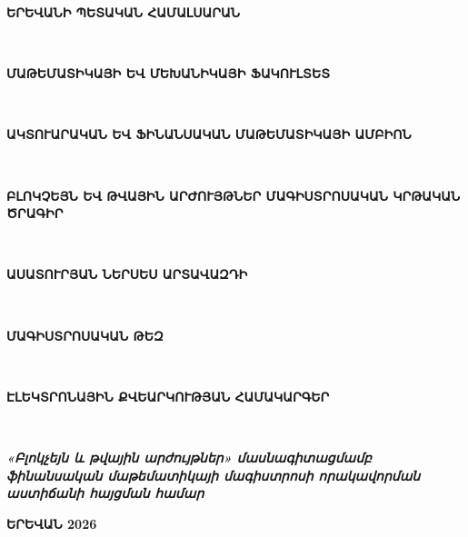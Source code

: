 \documentclass[12pt,a4paper,oneside]{report}
\begin{document}
\begin{titlepage}
\centering
\begin{armenian}
\fontsize{18}{22}\selectfont\textbf{ԵՐԵՎԱՆԻ ՊԵՏԱԿԱՆ ՀԱՄԱԼՍԱՐԱՆ}
\end{armenian}
\\[1.2cm]
\begin{armenian}
\fontsize{18}{22}\selectfont\textbf{ՄԱԹԵՄԱՏԻԿԱՅԻ ԵՎ ՄԵԽԱՆԻԿԱՅԻ ՖԱԿՈՒԼՏԵՏ}
\end{armenian}
\\[0.8cm]
\begin{armenian}
\fontsize{16}{20}\selectfont\textbf{ԱԿՏՈՒԱՐԱԿԱՆ ԵՎ ՖԻՆԱՆՍԱԿԱՆ ՄԱԹԵՄԱՏԻԿԱՅԻ ԱՄԲԻՈՆ}
\end{armenian}
\\[0.8cm]
\begin{armenian}
\fontsize{18}{22}\selectfont\textbf{ԲԼՈԿՉԵՅՆ ԵՎ ԹՎԱՅԻՆ ԱՐԺՈՒՅԹՆԵՐ ՄԱԳԻՍՏՐՈՍԱԿԱՆ ԿՐԹԱԿԱՆ ԾՐԱԳԻՐ}
\end{armenian}
\\[2.5cm]
\begin{armenian}
\fontsize{18}{22}\selectfont\textbf{ԱՍԱՏՈՒՐՅԱՆ ՆԵՐՍԵՍ ԱՐՏԱՎԱԶԴԻ}
\end{armenian}
\\[1.5cm]
\begin{armenian}
\fontsize{18}{22}\selectfont\textbf{ՄԱԳԻՍՏՐՈՍԱԿԱՆ ԹԵԶ}
\end{armenian}
\\[0.8cm]
\begin{armenian}
\fontsize{16}{20}\selectfont\textbf{ԷԼԵԿՏՐՈՆԱՅԻՆ ՔՎԵԱՐԿՈՒԹՅԱՆ ՀԱՄԱԿԱՐԳԵՐ}
\end{armenian}
\\[1.5cm]
\begin{armenian}
\fontsize{14}{18}\selectfont\textit{\textbf{«Բլոկչեյն և թվային արժույթներ» մասնագիտացմամբ\\
ֆինանսական մաթեմատիկայի մագիստրոսի որակավորման\\
աստիճանի հայցման համար}}
\end{armenian}

\vfill

\begin{armenian}
\fontsize{13}{16}\selectfont\textbf{ԵՐԵՎԱՆ 2026}
\end{armenian}
\end{titlepage}

\thispagestyle{empty}
\vspace*{2cm}
\end{document}
